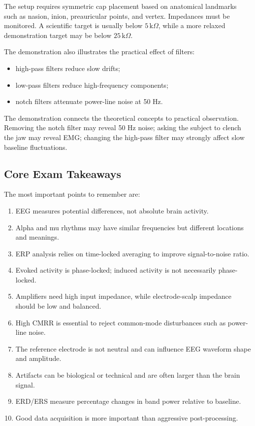 The setup requires symmetric cap placement based on anatomical landmarks such as nasion, inion, preauricular points, and vertex. Impedances must be monitored. A scientific target is usually below $5\,\text{k}\Omega$, while a more relaxed demonstration target may be below $25\,\text{k}\Omega$.

The demonstration also illustrates the practical effect of filters:

\begin{itemize}[noitemsep]
    \item high-pass filters reduce slow drifts;
    \item low-pass filters reduce high-frequency components;
    \item notch filters attenuate power-line noise at 50 Hz.
\end{itemize}

\begin{authornote}
The demonstration connects the theoretical concepts to practical observation. Removing the notch filter may reveal 50 Hz noise; asking the subject to clench the jaw may reveal EMG; changing the high-pass filter may strongly affect slow baseline fluctuations.
\end{authornote}

\subsection{Core Exam Takeaways}

The most important points to remember are:

\begin{enumerate}
    \item EEG measures potential differences, not absolute brain activity.
    \item Alpha and mu rhythms may have similar frequencies but different locations and meanings.
    \item ERP analysis relies on time-locked averaging to improve signal-to-noise ratio.
    \item Evoked activity is phase-locked; induced activity is not necessarily phase-locked.
    \item Amplifiers need high input impedance, while electrode-scalp impedance should be low and balanced.
    \item High CMRR is essential to reject common-mode disturbances such as power-line noise.
    \item The reference electrode is not neutral and can influence EEG waveform shape and amplitude.
    \item Artifacts can be biological or technical and are often larger than the brain signal.
    \item ERD/ERS measure percentage changes in band power relative to baseline.
    \item Good data acquisition is more important than aggressive post-processing.
\end{enumerate}

